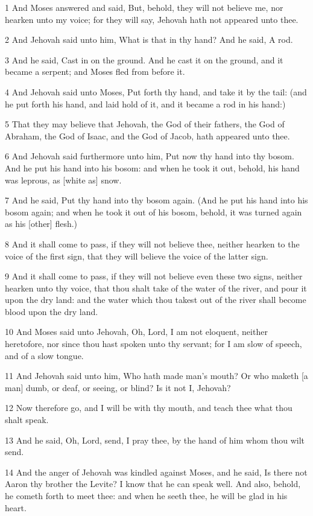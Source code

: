 \par 1 And Moses answered and said, But, behold, they will not believe me, nor hearken unto my voice; for they will say, Jehovah hath not appeared unto thee.
\par 2 And Jehovah said unto him, What is that in thy hand? And he said, A rod.
\par 3 And he said, Cast in on the ground. And he cast it on the ground, and it became a serpent; and Moses fled from before it.
\par 4 And Jehovah said unto Moses, Put forth thy hand, and take it by the tail: (and he put forth his hand, and laid hold of it, and it became a rod in his hand:)
\par 5 That they may believe that Jehovah, the God of their fathers, the God of Abraham, the God of Isaac, and the God of Jacob, hath appeared unto thee.
\par 6 And Jehovah said furthermore unto him, Put now thy hand into thy bosom. And he put his hand into his bosom: and when he took it out, behold, his hand was leprous, as [white as] snow.
\par 7 And he said, Put thy hand into thy bosom again. (And he put his hand into his bosom again; and when he took it out of his bosom, behold, it was turned again as his [other] flesh.)
\par 8 And it shall come to pass, if they will not believe thee, neither hearken to the voice of the first sign, that they will believe the voice of the latter sign.
\par 9 And it shall come to pass, if they will not believe even these two signs, neither hearken unto thy voice, that thou shalt take of the water of the river, and pour it upon the dry land: and the water which thou takest out of the river shall become blood upon the dry land.
\par 10 And Moses said unto Jehovah, Oh, Lord, I am not eloquent, neither heretofore, nor since thou hast spoken unto thy servant; for I am slow of speech, and of a slow tongue.
\par 11 And Jehovah said unto him, Who hath made man's mouth? Or who maketh [a man] dumb, or deaf, or seeing, or blind? Is it not I, Jehovah?
\par 12 Now therefore go, and I will be with thy mouth, and teach thee what thou shalt speak.
\par 13 And he said, Oh, Lord, send, I pray thee, by the hand of him whom thou wilt send.
\par 14 And the anger of Jehovah was kindled against Moses, and he said, Is there not Aaron thy brother the Levite? I know that he can speak well. And also, behold, he cometh forth to meet thee: and when he seeth thee, he will be glad in his heart.
